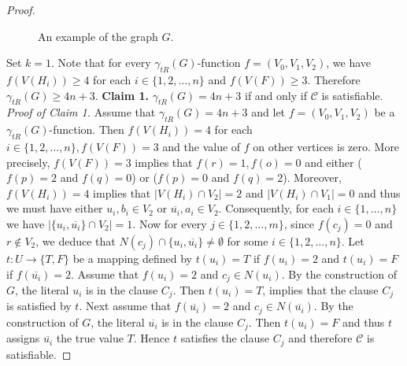 \documentclass[12pt,reqno]{amsart}
\theoremstyle{plain}
\numberwithin{equation}{section}
\begin{document}
\begin{proof}
\begin{figure}[ht]
\caption{An example of the graph $G$.}
\label{fig-2}
\end{figure}

Set $k=1$. Note that for every $\gamma _{tR}(G)$-function $f=(V_0, V_1, V_2)$, we
have $f(V(H_i))\geq 4$ for each $i\in \{1,2,\dots ,n\}$ and $f(V(F))\geq 3$. Therefore $\gamma _{tR}(G)\geq 4n+3$.\newline
\newline
\textbf{Claim 1.} $\gamma _{tR}(G)=4n+3$ if and only if $\mathcal{C}$ is satisfiable.\newline
\textit{Proof of Claim 1.} Assume that $\gamma _{tR}(G)=4n+3$ and let $f=(V_0, V_1, V_2)$ be a $\gamma _{tR}(G)$-function. Then $f(V(H_i))=4$ for each $i\in \{1,2,\dots ,n\}, f(V(F))=3$  and the value of $f$ on other vertices is zero. More precisely, $f(V(F))=3$ implies that $f(r)=1,f(o)=0$ and either ($f(p)=2$ and $f(q)=0$) or ($f(p)=0$ and $f(q)=2$). Moreover, $f(V(H_i))=4$ implies that $\left\vert V(H_i)\cap V_2\right\vert =2$ and $\left\vert V(H_i)\cap V_1\right\vert =0$ and thus we must have either $u_i,b_i\in V_2$ or
$\overline{u_i},a_i\in V_2$. Consequently, for each $i \in \{1, \dots , n\}$ we have $\left\vert \{u_i,\overline{u_i}\}\cap V_2\right\vert =1$. Now for every $j\in\{1, 2, \dots , m\}$, since $f(c_j)=0$ and $r\notin V_2$, we deduce that  $N(c_j)\cap \{u_i,\overline{u_i}\}\neq \emptyset $ for some $i\in \{1,2,\dots ,n\}$. Let $t:U\longrightarrow \{T,F\}$ be a mapping defined by $t(u_i)=T$ if $f(u_i)=2$ and $t(u_i)=F$ if $f(\overline{u_i})=2$.
Assume that $f(u_i)=2$ and $c_j\in N(u_i)$. By the construction of $G$, the literal $u_i$ is in the clause $C_j$. Then $t(u_i)=T$, implies that the clause $C_j$ is satisfied by $t$. Next assume that $f(\overline{u_i})=2$ and $c_j\in N(\overline{u_i})$. By the construction of $G$, the literal $\overline{u_i}$ is in the clause $C_j$. Then $t(u_i)=F$ and thus $t$ assigns $\overline{u_i}$ the true value $T$. Hence $t$ satisfies the clause $C_j$ and therefore $\mathcal{C}$ is satisfiable.


\end{proof}
\end{document}
